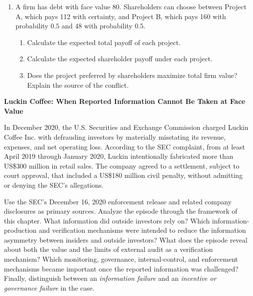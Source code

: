 \begin{enumerate}
\item A firm has debt with face value 80. Shareholders can choose between Project A, which pays 112 with certainty, and Project B, which pays 160 with probability $0.5$ and 48 with probability $0.5$.

  \begin{enumerate}

  \item Calculate the expected total payoff of each project.

  \item Calculate the expected shareholder payoff under each project.

  \item Does the project preferred by shareholders maximize total firm value? Explain the source of the conflict.

  \end{enumerate}

\end{enumerate}



\textbf{Luckin Coffee: When Reported Information Cannot Be Taken at Face Value}

In December 2020, the U.S. Securities and Exchange Commission charged Luckin Coffee Inc. with defrauding investors by materially misstating its revenue, expenses, and net operating loss. According to the SEC complaint, from at least April 2019 through January 2020, Luckin intentionally fabricated more than US\$300 million in retail sales. The company agreed to a settlement, subject to court approval, that included a US\$180 million civil penalty, without admitting or denying the SEC's allegations.

Use the SEC's December 16, 2020 enforcement release and related company disclosures as primary sources. Analyze the episode through the framework of this chapter. What information did outside investors rely on? Which information-production and verification mechanisms were intended to reduce the information asymmetry between insiders and outside investors? What does the episode reveal about both the value and the limits of external audit as a verification mechanism? Which monitoring, governance, internal-control, and enforcement mechanisms became important once the reported information was challenged? Finally, distinguish between an \emph{information failure} and an \emph{incentive or governance failure} in the case.

